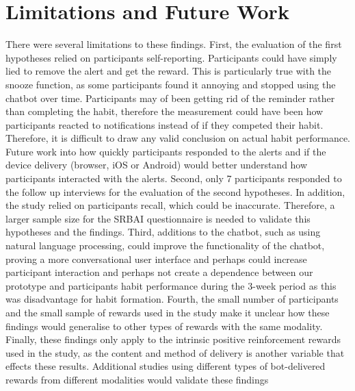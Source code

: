 
\newpage

\section{Limitations and Future Work} \label{limitations_and_future_work}
There were several limitations to these findings. First, the evaluation of the first hypotheses relied on participants self-reporting. Participants could have simply lied to remove the alert and get the reward. This is particularly true with the snooze function, as some participants found it annoying and stopped using the chatbot over time. Participants may of been getting rid of the reminder rather than completing the habit, therefore the measurement could have been how participants reacted to notifications instead of if they competed their habit. Therefore, it is difficult to draw any valid conclusion on actual habit performance. Future work into how quickly participants responded to the alerts and if the device delivery (browser, iOS or Android) would better understand how participants interacted with the alerts. Second, only 7 participants responded to the follow up interviews for the evaluation of the second hypotheses. In addition, the study relied on participants recall, which could be inaccurate. Therefore, a larger sample size for the SRBAI questionnaire is needed to validate this hypotheses and the findings. Third, additions to the chatbot, such as using natural language processing, could improve the functionality of the chatbot, proving a more conversational user interface and perhaps could increase participant interaction and perhaps not create a dependence between our prototype and participants habit performance during the 3-week period as this was disadvantage for habit formation. Fourth, the small number of participants and the small sample of rewards used in the study make it unclear how these findings would generalise to other types of rewards with the same modality. Finally, these findings only apply to the intrinsic positive reinforcement rewards used in the study, as the content and method of delivery is another variable that effects these results. Additional studies using different types of bot-delivered rewards from different modalities would validate these findings


